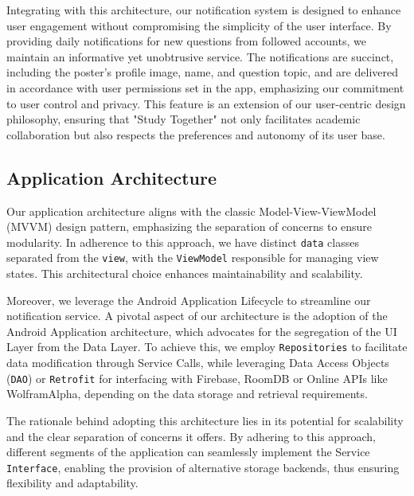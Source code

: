 Integrating with this architecture, our notification system is designed to enhance user engagement without compromising the simplicity of the user interface. By providing daily notifications for new questions from followed accounts, we maintain an informative yet unobtrusive service. The notifications are succinct, including the poster's profile image, name, and question topic, and are delivered in accordance with user permissions set in the app, emphasizing our commitment to user control and privacy. This feature is an extension of our user-centric design philosophy, ensuring that "Study Together" not only facilitates academic collaboration but also respects the preferences and autonomy of its user base.
 

\subsection{Application Architecture}\label{application_architecture}

Our application architecture aligns with the classic Model-View-ViewModel (MVVM) design pattern, emphasizing the separation of concerns to ensure modularity. In adherence to this approach, we have distinct \texttt{data} classes separated from the \texttt{view}, with the \texttt{ViewModel} responsible for managing view states. This architectural choice enhances maintainability and scalability.

Moreover, we leverage the Android Application Lifecycle to streamline our notification service. A pivotal aspect of our architecture is the adoption of the Android Application architecture, which advocates for the segregation of the UI Layer from the Data Layer. To achieve this, we employ \texttt{Repositories} to facilitate data modification through Service Calls, while leveraging Data Access Objects (\texttt{DAO}) or \texttt{Retrofit} for interfacing with Firebase, RoomDB or Online APIs like WolframAlpha, depending on the data storage and retrieval requirements.

The rationale behind adopting this architecture lies in its potential for scalability and the clear separation of concerns it offers. By adhering to this approach, different segments of the application can seamlessly implement the Service \texttt{Interface}, enabling the provision of alternative storage backends, thus ensuring flexibility and adaptability.

